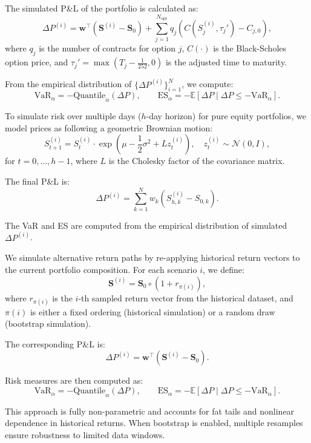 \documentclass[12pt]{article}
\begin{document}
The simulated P\&L of the portfolio is calculated as:
\[
\Delta P^{(i)} = \mathbf{w}^\top(\mathbf{S}^{(i)} - \mathbf{S}_0) + \sum_{j=1}^{N_{\mathrm{opt}}} q_j \left(C(S_j^{(i)}, \tau_j') - C_{j,0}\right),
\]
where $q_j$ is the number of contracts for option $j$, $C(\cdot)$ is the Black-Scholes option price, and $\tau_j' = \max(T_j - \frac{1}{252}, 0)$ is the adjusted time to maturity.

From the empirical distribution of $\{\Delta P^{(i)}\}_{i=1}^N$, we compute:
\[
\text{VaR}_\alpha = -\text{Quantile}_\alpha(\Delta P), \qquad
\text{ES}_\alpha = -\mathbb{E}[\Delta P \mid \Delta P \le -\text{VaR}_\alpha].
\]

\vspace{1em}
\underline{}

\vspace{0.6em}
To simulate risk over multiple days ($h$-day horizon) for pure equity portfolios, we model prices as following a geometric Brownian motion:
\[
S_{t+1}^{(i)} = S_t^{(i)} \cdot \exp\left(\mu - \frac{1}{2} \sigma^2 + L z_t^{(i)}\right), \quad z_t^{(i)} \sim \mathcal{N}(0, I),
\]
for $t = 0, \dots, h-1$, where $L$ is the Cholesky factor of the covariance matrix.

The final P\&L is:
\[
\Delta P^{(i)} = \sum_{k=1}^N w_k (S_{h,k}^{(i)} - S_{0,k}).
\]

The VaR and ES are computed from the empirical distribution of simulated $\Delta P^{(i)}$.

\vspace{1em}
\underline{}

\vspace{0.6em}
We simulate alternative return paths by re-applying historical return vectors to the current portfolio composition. For each scenario $i$, we define:
\[
\mathbf{S}^{(i)} = \mathbf{S}_0 \circ (1 + r_{\pi(i)}),
\]
where $r_{\pi(i)}$ is the $i$-th sampled return vector from the historical dataset, and $\pi(i)$ is either a fixed ordering (historical simulation) or a random draw (bootstrap simulation).

The corresponding P\&L is:
\[
\Delta P^{(i)} = \mathbf{w}^\top (\mathbf{S}^{(i)} - \mathbf{S}_0).
\]

Risk measures are then computed as:
\[
\text{VaR}_\alpha = -\text{Quantile}_\alpha(\Delta P), \qquad
\text{ES}_\alpha = -\mathbb{E}[\Delta P \mid \Delta P \le -\text{VaR}_\alpha].
\]

This approach is fully non-parametric and accounts for fat tails and nonlinear dependence in historical returns. When bootstrap is enabled, multiple resamples ensure robustness to limited data windows.
\end{document}
